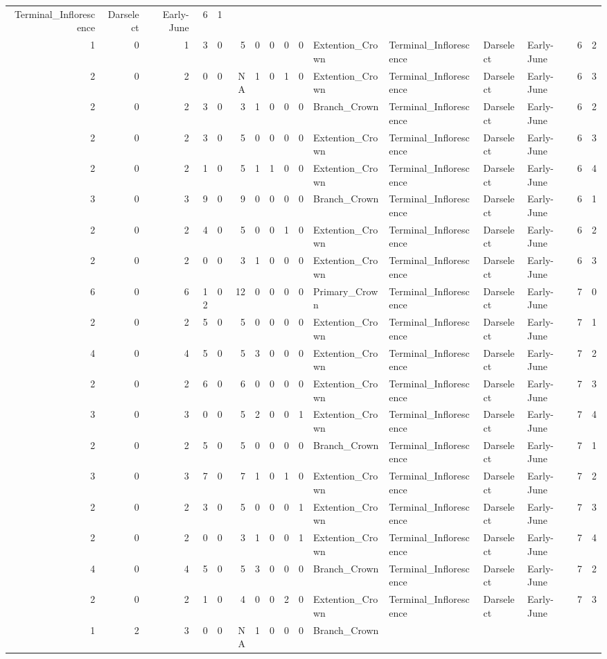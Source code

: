 \documentclass[]{article}
\begin{document}
\begin{longtable}[]{@{}rrrrrrrrrrllllrl@{}}
Terminal\_Inflorescence & Darselect & Early-June & 6 & 1\tabularnewline
1 & 0 & 1 & 3 & 0 & 5 & 0 & 0 & 0 & 0 & Extention\_Crown &
Terminal\_Inflorescence & Darselect & Early-June & 6 & 2\tabularnewline
2 & 0 & 2 & 0 & 0 & NA & 1 & 0 & 1 & 0 & Extention\_Crown &
Terminal\_Inflorescence & Darselect & Early-June & 6 & 3\tabularnewline
2 & 0 & 2 & 3 & 0 & 3 & 1 & 0 & 0 & 0 & Branch\_Crown &
Terminal\_Inflorescence & Darselect & Early-June & 6 & 2\tabularnewline
2 & 0 & 2 & 3 & 0 & 5 & 0 & 0 & 0 & 0 & Extention\_Crown &
Terminal\_Inflorescence & Darselect & Early-June & 6 & 3\tabularnewline
2 & 0 & 2 & 1 & 0 & 5 & 1 & 1 & 0 & 0 & Extention\_Crown &
Terminal\_Inflorescence & Darselect & Early-June & 6 & 4\tabularnewline
3 & 0 & 3 & 9 & 0 & 9 & 0 & 0 & 0 & 0 & Branch\_Crown &
Terminal\_Inflorescence & Darselect & Early-June & 6 & 1\tabularnewline
2 & 0 & 2 & 4 & 0 & 5 & 0 & 0 & 1 & 0 & Extention\_Crown &
Terminal\_Inflorescence & Darselect & Early-June & 6 & 2\tabularnewline
2 & 0 & 2 & 0 & 0 & 3 & 1 & 0 & 0 & 0 & Extention\_Crown &
Terminal\_Inflorescence & Darselect & Early-June & 6 & 3\tabularnewline
6 & 0 & 6 & 12 & 0 & 12 & 0 & 0 & 0 & 0 & Primary\_Crown &
Terminal\_Inflorescence & Darselect & Early-June & 7 & 0\tabularnewline
2 & 0 & 2 & 5 & 0 & 5 & 0 & 0 & 0 & 0 & Extention\_Crown &
Terminal\_Inflorescence & Darselect & Early-June & 7 & 1\tabularnewline
4 & 0 & 4 & 5 & 0 & 5 & 3 & 0 & 0 & 0 & Extention\_Crown &
Terminal\_Inflorescence & Darselect & Early-June & 7 & 2\tabularnewline
2 & 0 & 2 & 6 & 0 & 6 & 0 & 0 & 0 & 0 & Extention\_Crown &
Terminal\_Inflorescence & Darselect & Early-June & 7 & 3\tabularnewline
3 & 0 & 3 & 0 & 0 & 5 & 2 & 0 & 0 & 1 & Extention\_Crown &
Terminal\_Inflorescence & Darselect & Early-June & 7 & 4\tabularnewline
2 & 0 & 2 & 5 & 0 & 5 & 0 & 0 & 0 & 0 & Branch\_Crown &
Terminal\_Inflorescence & Darselect & Early-June & 7 & 1\tabularnewline
3 & 0 & 3 & 7 & 0 & 7 & 1 & 0 & 1 & 0 & Extention\_Crown &
Terminal\_Inflorescence & Darselect & Early-June & 7 & 2\tabularnewline
2 & 0 & 2 & 3 & 0 & 5 & 0 & 0 & 0 & 1 & Extention\_Crown &
Terminal\_Inflorescence & Darselect & Early-June & 7 & 3\tabularnewline
2 & 0 & 2 & 0 & 0 & 3 & 1 & 0 & 0 & 1 & Extention\_Crown &
Terminal\_Inflorescence & Darselect & Early-June & 7 & 4\tabularnewline
4 & 0 & 4 & 5 & 0 & 5 & 3 & 0 & 0 & 0 & Branch\_Crown &
Terminal\_Inflorescence & Darselect & Early-June & 7 & 2\tabularnewline
2 & 0 & 2 & 1 & 0 & 4 & 0 & 0 & 2 & 0 & Extention\_Crown &
Terminal\_Inflorescence & Darselect & Early-June & 7 & 3\tabularnewline
1 & 2 & 3 & 0 & 0 & NA & 1 & 0 & 0 & 0 & Branch\_Crown &

\end{longtable}
\end{document}

